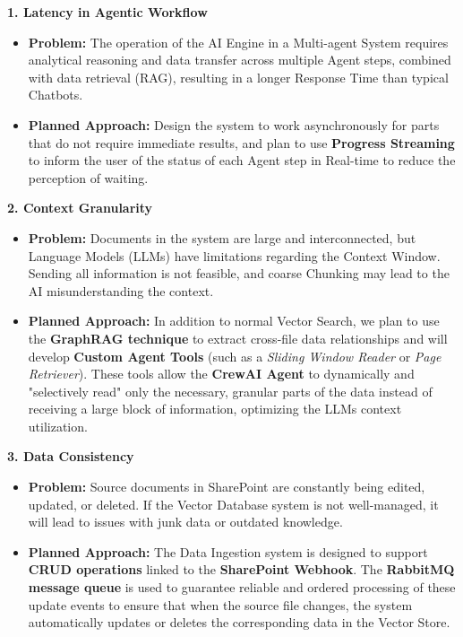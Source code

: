 \documentclass[12pt]{article}
\begin{document}
\textbf{1. Latency in Agentic Workflow}

\begin{itemize}
\item
  \textbf{Problem:} The operation of the AI Engine in a Multi-agent
  System requires analytical reasoning and data transfer across multiple
  Agent steps, combined with data retrieval (RAG), resulting in a longer
  Response Time than typical Chatbots.
\item
  \textbf{Planned Approach:} Design the system to work asynchronously
  for parts that do not require immediate results, and plan to use
  \textbf{Progress Streaming} to inform the user of the status of each
  Agent step in Real-time to reduce the perception of waiting.
\end{itemize}

\textbf{2. Context Granularity}

\begin{itemize}
\item
  \textbf{Problem:} Documents in the system are large and
  interconnected, but Language Models (LLMs) have limitations regarding
  the Context Window. Sending all information is not feasible, and
  coarse Chunking may lead to the AI misunderstanding the context.
\item
  \textbf{Planned Approach:} In addition to normal Vector Search, we
  plan to use the \textbf{GraphRAG technique} to extract cross-file data
  relationships and will develop \textbf{Custom Agent Tools} (such as a
  \emph{Sliding Window Reader} or \emph{Page Retriever}). These tools
  allow the \textbf{CrewAI Agent} to dynamically and "selectively read"
  only the necessary, granular parts of the data instead of receiving a
  large block of information, optimizing the LLM\textquotesingle s
  context utilization.
\end{itemize}

\textbf{3. Data Consistency}

\begin{itemize}
\item
  \textbf{Problem:} Source documents in SharePoint are constantly being
  edited, updated, or deleted. If the Vector Database system is not
  well-managed, it will lead to issues with junk data or outdated
  knowledge.
\item
  \textbf{Planned Approach:} The Data Ingestion system is designed to
  support \textbf{CRUD operations} linked to the \textbf{SharePoint
  Webhook}. The \textbf{RabbitMQ message queue} is used to guarantee
  reliable and ordered processing of these update events to ensure that
  when the source file changes, the system automatically updates or
  deletes the corresponding data in the Vector Store.
\end{itemize}
\end{document}
